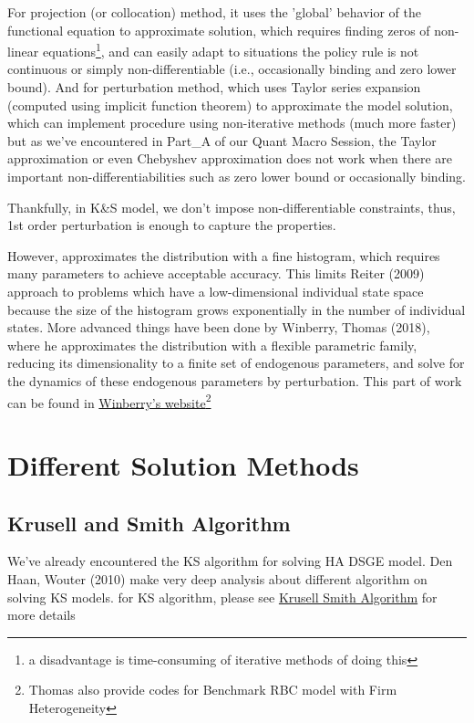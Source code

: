 For projection (or collocation) method, it uses the 'global' behavior of the functional equation to approximate solution, which requires finding zeros of non-linear equations\footnote{a disadvantage is time-consuming of iterative methods of doing this}, and can easily adapt to situations the policy rule is not continuous or simply non-differentiable (i.e., occasionally binding and zero lower bound). And for perturbation method, which uses Taylor series expansion (computed using implicit function theorem) to approximate the model solution, which can implement procedure using non-iterative methods (much more faster) but as we've encountered in Part\_A of our Quant Macro Session, the Taylor approximation or even Chebyshev approximation does not work when there are important non-differentiabilities such as zero lower bound or occasionally binding. 

Thankfully, in K\&S model, we don't impose non-differentiable constraints, thus, 1st order perturbation is enough to capture the properties.  

However, approximates the distribution with a fine histogram, which requires many parameters to achieve acceptable accuracy. This limits Reiter (2009)\cite{reiter2009solving} approach to problems which have a low-dimensional individual state space because the size of the histogram grows exponentially in the number of individual states. More advanced things have been done by Winberry, Thomas (2018)\cite{winberry2018method}, where he approximates the distribution with a flexible parametric family, reducing its dimensionality to a finite set of endogenous parameters, and solve for the dynamics of these endogenous parameters by perturbation. This part of work can be found in  \href{http://faculty.chicagobooth.edu/thomas.winberry/research/index.html}{Winberry's website}\footnote{Thomas also provide codes for Benchmark RBC model with Firm Heterogeneity}

\section{Different Solution Methods}
\subsection{Krusell and Smith Algorithm}

We've already encountered the KS algorithm for solving HA DSGE model. Den Haan, Wouter (2010)\cite{den2010comparison} make very deep analysis about different algorithm on solving KS models. for KS algorithm, please see \href{https://github.com/davidrpugh/pyeconomics/wiki/Krusell-Smith-Algorithm}{Krusell Smith Algorithm} for more details

